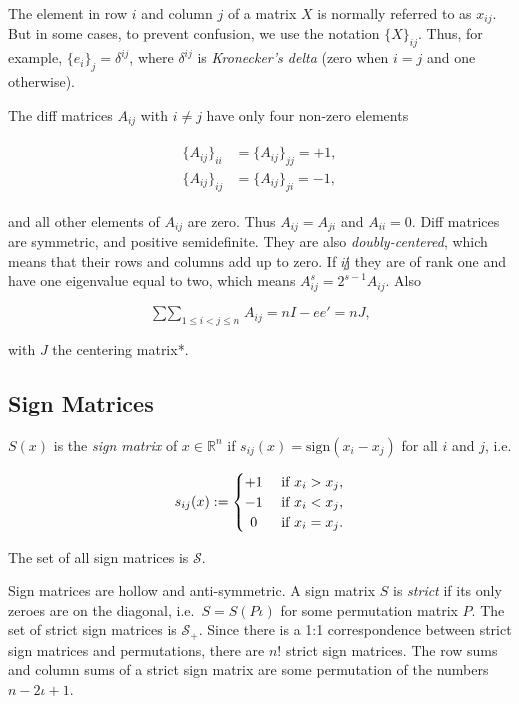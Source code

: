 \documentclass[
  12pt,
]{book}
\theoremstyle{definition}
\theoremstyle{definition}
\theoremstyle{definition}
\theoremstyle{definition}
\theoremstyle{remark}
\begin{document}
The element in row \(i\) and column \(j\) of a matrix \(X\) is normally referred to as \(x_{ij}\). But in some cases, to prevent confusion, we use the notation \(\{X\}_{ij}\). Thus, for example, \(\{e_i\}_j=\delta^{ij}\), where \(\delta^{ij}\) is \emph{Kronecker's delta} (zero when \(i=j\) and one otherwise).

The diff matrices \(A_{ij}\) with \(i\not= j\) have only four non-zero elements

\begin{align}
\begin{split}
\{A_{ij}\}_{ii}&=\{A_{ij}\}_{jj}=+1,\\
\{A_{ij}\}_{ij}&=\{A_{ij}\}_{ji}=-1,
\end{split}
\label{eq:apaele}
\end{align}

and all other elements of \(A_{ij}\) are zero. Thus \(A_{ij}=A_{ji}\) and \(A_{ii}=0\). Diff matrices are symmetric, and positive semidefinite. They are also \emph{doubly-centered}, which means that their rows and columns add up to zero. If \(i\not j\) they are of rank one and have one eigenvalue equal to two, which means
\(A_{ij}^s=2^{s-1}A_{ij}\). Also

\begin{equation}
\mathop{\sum\sum}_{1\leq i<j\leq n} A_{ij}=nI-ee'=nJ,
\label{eq:asum}
\end{equation}

with \(J\) the centering matrix*.

\hypertarget{apsign}{%
\subsection{Sign Matrices}\label{apsign}}

\(S(x)\) is the \emph{sign matrix} of \(x\in\mathbb{R}^n\) if \(s_{ij}(x)=\text{sign}(x_i-x_j)\) for all \(i\) and \(j\), i.e.

\begin{equation}
s_{ij}(x):=\begin{cases}+1&\text{ if }x_i>x_j,\\
-1&\text{ if }x_i<x_j,\\
\hfill 0&\text{ if }x_i=x_j.
\end{cases}
\label{eq:signdef}
\end{equation}

The set of all sign matrices is \(\mathcal{S}\).

Sign matrices are hollow and anti-symmetric. A sign matrix \(S\) is \emph{strict} if its only zeroes are on the diagonal, i.e.~\(S=S(P\iota)\) for some permutation matrix \(P\). The set of strict sign matrices is \(\mathcal{S}_+\). Since there is a 1:1 correspondence between strict sign matrices and permutations, there are \(n!\) strict sign matrices. The row sums and column sums of a strict sign matrix are some permutation of the numbers
\(n-2\iota+1\).
\end{document}
